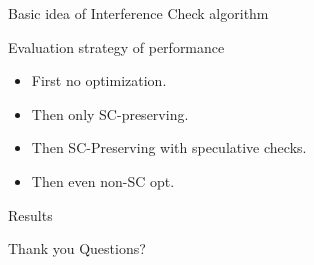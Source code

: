 \documentclass{beamer}
\begin{document}
    \begin{frame}{Basic idea of Interference Check algorithm}
        
        \begin{figure}
        \end{figure}
        
    \end{frame}


    \begin{frame}{Evaluation strategy of performance}

        \begin{itemize}
            \item First no optimization.
            \item Then only SC-preserving.
            \item Then SC-Preserving with speculative checks.
            \item Then even non-SC opt.
        \end{itemize}
        
    \end{frame}

    
    \begin{frame}{Results}

        \begin{figure}
        \end{figure}

    \end{frame}

    \begin{frame}{Thank you}
        Questions?
    \end{frame}
\end{document}
